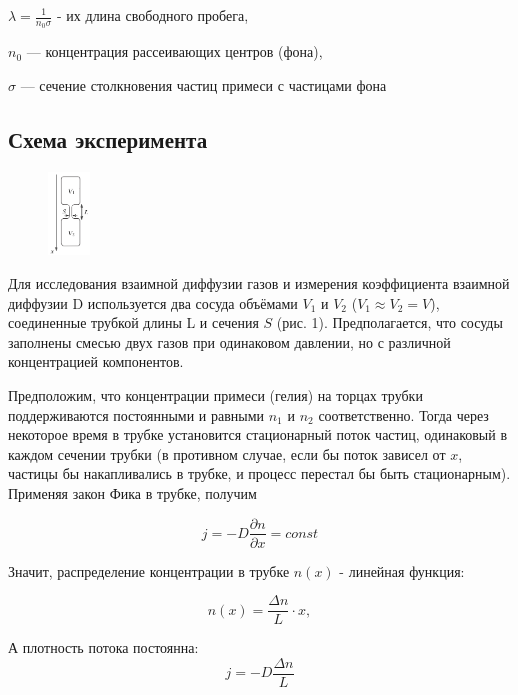 \documentclass[a4paper]{article}
\begin{document}
$\lambda = \frac{1}{n_0 \sigma}$ - их длина свободного пробега, 

$n_0$ — концентрация рассеивающих центров (фона),

$\sigma$ — сечение столкновения частиц примеси с частицами фона

\subsection{Схема эксперимента}

\begin{figure}
    \centering
    \includegraphics[width = 0.10\textwidth]{V1V2.png}
    \caption{}
\end{figure}

Для исследования взаимной диффузии газов и
измерения коэффициента взаимной диффузии D используется два сосуда
объёмами $V_1$ и $V_2$ ($V_1 \approx V_2 = V$), соединенные трубкой длины L и 
сечения $S$ (рис. 1). Предполагается, что сосуды заполнены смесью двух газов
при одинаковом давлении, но с различной концентрацией компонентов.

Предположим, что концентрации примеси (гелия) на торцах трубки поддерживаются постоянными и
равными $n_1$ и $n_2$ соответственно. Тогда через некоторое
время в трубке установится стационарный поток частиц, одинаковый в
каждом сечении трубки (в противном случае, если бы поток зависел от $x$,
частицы бы накапливались в трубке, и процесс перестал бы быть стационарным).
Применяя закон Фика в трубке, получим

\begin{equation}
    j = -D \frac{\partial n}{\partial x} = const
\end{equation}

\newpage

Значит, распределение концентрации в трубке $n(x)$ - линейная функция:

\begin{equation}
    n(x) = \frac{\Delta n}{L} \cdot x,
\end{equation}

А плотность потока постоянна:
\begin{equation}
    j = -D \frac{\Delta n}{L}
\end{equation}
\end{document}
